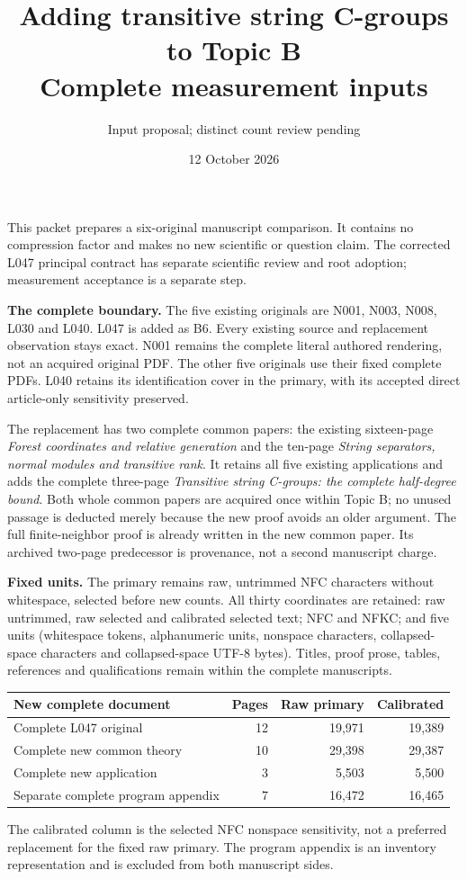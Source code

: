 \documentclass[11pt]{article}
\title{Adding transitive string C-groups to Topic B\\Complete measurement inputs}
\author{Input proposal; distinct count review pending}\date{12 October 2026}
\begin{document}
\maketitle
This packet prepares a six-original manuscript comparison. It contains no
compression factor and makes no new scientific or question claim. The corrected
L047 principal contract has separate scientific review and root adoption;
measurement acceptance is a separate step.

\textbf{The complete boundary.}
The five existing originals are N001, N003, N008, L030 and L040. L047 is added
as B6. Every existing source and replacement observation stays exact. N001
remains the complete literal authored rendering, not an acquired original PDF.
The other five originals use their fixed complete PDFs. L040 retains its
identification cover in the primary, with its accepted direct article-only
sensitivity preserved.

The replacement has two complete common papers: the existing sixteen-page
\emph{Forest coordinates and relative generation} and the ten-page
\emph{String separators, normal modules and transitive rank}. It retains all
five existing applications and adds the complete three-page
\emph{Transitive string C-groups: the complete half-degree bound}.
Both whole common papers are acquired once within Topic B; no unused passage
is deducted merely because the new proof avoids an older argument. The full
finite-neighbor proof is already written in the new common paper. Its archived
two-page predecessor is provenance, not a second manuscript charge.

\textbf{Fixed units.}
The primary remains raw, untrimmed NFC characters without whitespace, selected
before new counts. All thirty coordinates are retained: raw untrimmed, raw
selected and calibrated selected text; NFC and NFKC; and five units
(whitespace tokens, alphanumeric units, nonspace characters, collapsed-space
characters and collapsed-space UTF-8 bytes). Titles, proof prose, tables,
references and qualifications remain within the complete manuscripts.

\begin{center}\small
\begin{tabular}{@{}p{65mm}rrr@{}}\toprule
New complete document & Pages & Raw primary & Calibrated\\\midrule
Complete L047 original & 12 & 19,971 & 19,389 \\
Complete new common theory & 10 & 29,398 & 29,387 \\
Complete new application & 3 & 5,503 & 5,500 \\
Separate complete program appendix & 7 & 16,472 & 16,465 \\
\bottomrule\end{tabular}\end{center}
The calibrated column is the selected NFC nonspace sensitivity, not a preferred
replacement for the fixed raw primary. The program appendix is an inventory
representation and is excluded from both manuscript sides.
\end{document}
